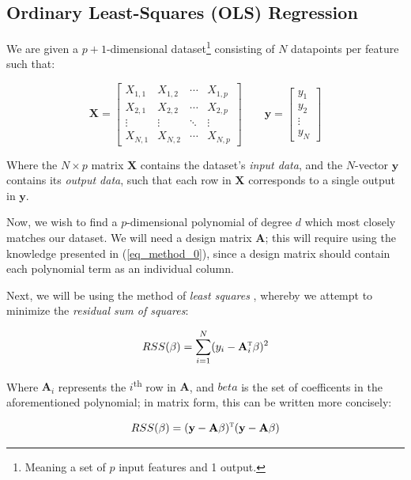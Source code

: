\documentclass[a4paper,10pt,english]{article}
\begin{document}
\subsection{Ordinary Least-Squares (OLS) Regression}

We are given a $p+1$-dimensional dataset\footnote{Meaning a set of $p$ input features and 1 output.} consisting of $N$ datapoints per feature such that:

\begin{equation}
\label{eq_method_1}
\mathbf{X} = \begin{bmatrix} X_{1,1} & X_{1,2} & \cdots & X_{1,p} \\ X_{2,1} & X_{2,2} & \cdots & X_{2,p} \\ \vdots & \vdots & \ddots & \vdots \\ X_{N,1} & X_{N,2} & \cdots & X_{N,p} \end{bmatrix} \qquad \mathbf{y} = \begin{bmatrix} y_1 \\ y_2 \\ \vdots \\ y_N \end{bmatrix}
\end{equation}

Where the $N \times p$ matrix $\mathbf{X}$ contains the dataset's \textit{input data}, and the $N$-vector $\mathbf{y}$ contains its \textit{output data}, such that each row in $\mathbf{X}$ corresponds to a single output in $\mathbf{y}$.

Now, we wish to find a $p$-dimensional polynomial of degree $d$ which most closely matches our dataset. We will need a design matrix $\mathbf{A}$; this will require using the knowledge presented in (\ref{eq_method_0}), since a design matrix should contain each polynomial term as an individual column.

Next, we will be using the method of \textit{least squares} \cite{hastie_tibshirani_friedman_2013}, whereby we attempt to minimize the \textit{residual sum of squares}:

\begin{equation*}
RSS(\beta) = \sum_{i=1}^N (y_i - \mathbf{A}_i^\textsc{t} \beta)^2 
\end{equation*}

Where $\mathbf{A}_i$ represents the $i$\textsuperscript{th} row in $\mathbf{A}$, and $beta$ is the set of coefficents in the aforementioned polynomial; in matrix form, this can be written more concisely:

\begin{equation*}
RSS(\beta) = (\mathbf{y} - \mathbf{A} \beta)^\textsc{t}(\mathbf{y} - \mathbf{A} \beta)
\end{equation*}
\end{document}
